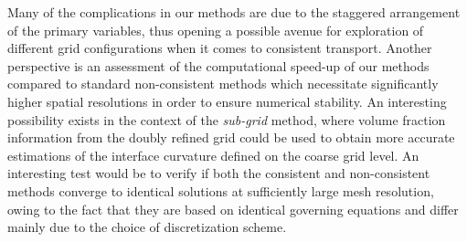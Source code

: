 Many of the complications in our methods are due to the staggered arrangement of the primary variables, 
thus opening a possible avenue for exploration of different grid configurations when it comes to consistent transport.
Another perspective is an assessment of the computational speed-up 
of our methods compared to standard non-consistent methods which necessitate 
significantly higher spatial resolutions in order to ensure numerical stability.  
An interesting possibility exists in the context of the \textit{sub-grid} method, 
where volume fraction information from the doubly refined grid could be used to
obtain more accurate estimations of the interface curvature defined on the coarse grid level. 
An interesting test would be to verify if both the consistent and non-consistent methods
converge to identical solutions at sufficiently large mesh resolution, owing to the fact that they 
are based on identical governing equations and differ mainly due to the choice of discretization scheme. 


